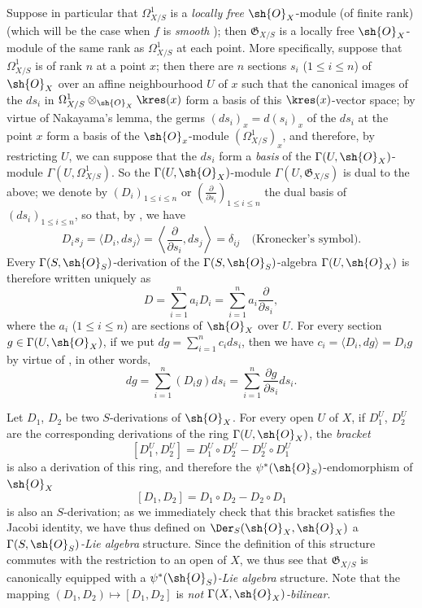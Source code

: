 \begin{env}[16.5.8]
\label{IV.16.5.8}
Suppose in particular that $\Omega_{X/S}^1$ is a \emph{locally free} $\sh{O}_X$-module (of finite rank) (which will be the case when $f$ is \emph{smooth} );
then $\mathfrak{G}_{X/S}$ is a locally free $\sh{O}_X$-module of the same rank as $\Omega_{X/S}^1$ at each point.
More specifically, suppose that $\Omega_{X/S}^1$ is of rank $n$ at a point $x$;
then there are $n$ sections $s_i$ ($1 \leq i \leq n$) of $\sh{O}_X$ over an affine neighbourhood $U$ of $x$ such that the canonical images of the $ds_i$ in $\Omega_{X/S}^1 \otimes_{\sh{O}_X} \kres(x)$ form a basis of this $\kres(x)$-vector space;
by virtue of Nakayama's lemma, the germs $(ds_i)_x = d(s_i)_x$ of the $ds_i$ at the point $x$ form a basis of the $\sh{O}_x$-module $(\Omega_{X/S}^1)_x$, and therefore, by restricting $U$, we can suppose that the $ds_i$ form a \emph{basis} of the $\Gamma(U, \sh{O}_X)$-module $\Gamma(U, \Omega_{X/S}^1)$.
So the $\Gamma(U, \sh{O}_X)$-module $\Gamma(U, \mathfrak{G}_{X/S})$ is dual to the above;
we denote by $(D_i)_{1 \leq i \leq n}$ or $\left(\frac{\partial}{\partial s_i}\right)_{1 \leq i \leq n}$ the dual basis of $(ds_i)_{1 \leq i \leq n}$, so that, by , we have
\[
\label{IV.16.5.8.1}
  D_i s_j = \langle D_i, ds_j \rangle = \left\langle \frac{\partial}{\partial s_i}, ds_j \right\rangle = \delta_{ij} \quad \text{(Kronecker's symbol)}.
  \tag{16.5.8.1}
\]
Every $\Gamma(S, \sh{O}_S)$-derivation of the $\Gamma(S, \sh{O}_S)$-algebra $\Gamma(U, \sh{O}_X)$ is therefore written uniquely as
\[
  D = \sum_{i = 1}^n a_i D_i = \sum_{i = 1}^n a_i \frac{\partial}{\partial s_i},
\] 
where the $a_i$ ($1 \leq i \leq n$) are sections of $\sh{O}_X$ over $U$.
For every section $g \in \Gamma(U, \sh{O}_X)$, if we put $dg = \sum_{i = 1}^n c_i ds_i$, then we have $c_i = \langle D_i, dg \rangle = D_i g$ by virtue of , in other words,
\[
\label{IV.16.5.8.2}
  dg = \sum_{i = 1}^n (D_i g) ds_i = \sum_{i = 1}^n \frac{\partial g}{\partial s_i} ds_i.
  \tag{16.5.8.2}
\]
\end{env}

\begin{env}[16.5.9]
\label{IV.16.5.9}
Let $D_1$, $D_2$ be two $S$-derivations of $\sh{O}_X$. 
For every open $U$ of $X$, if $D_1^U$, $D_2^U$ are the corresponding derivations of the ring $\Gamma(U, \sh{O}_X)$, the \emph{bracket}
\[
  [D_1^U, D_2^U] = D_1^U \circ D_2^U - D_2^U \circ D_1^U
\]
is also a derivation of this ring, and therefore the $\psi^*(\sh{O}_S)$-endomorphism of $\sh{O}_X$
\[
\label{IV.16.5.9.1}
  [D_1, D_2] = D_1 \circ D_2 - D_2 \circ D_1
  \tag{16.5.9.1}
\]
is also an $S$-derivation;
as we immediately check that this bracket satisfies the Jacobi identity, we have thus defined on $\Der_S(\sh{O}_X, \sh{O}_X)$ a \emph{$\Gamma(S, \sh{O}_S)$-Lie algebra} structure.
Since the definition of this structure commutes with the restriction to an open of $X$, we thus see that $\mathfrak{G}_{X/S}$ is canonically equipped with a \emph{ $\psi^*(\sh{O}_S)$-Lie algebra} structure.
Note that the mapping $(D_1, D_2) \mapsto [D_1, D_2]$ is \emph{not $\Gamma(X, \sh{O}_X)$-bilinear}.
\end{env} 

